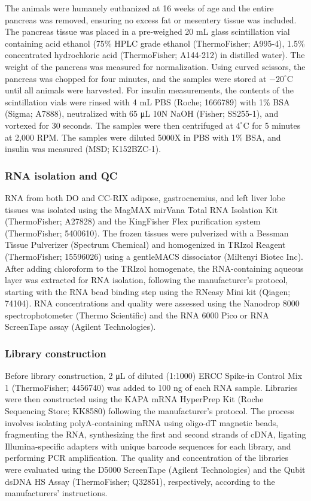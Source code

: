 \documentclass[
]{article}
\begin{document}
The animals were humanely euthanized at 16 weeks of age and the entire
pancreas was removed, ensuring no excess fat or mesentery tissue was
included. The pancreas tissue was placed in a pre-weighed 20 mL glass
scintillation vial containing acid ethanol (75\% HPLC grade ethanol
(ThermoFisher; A995-4), 1.5\% concentrated hydrochloric acid
(ThermoFisher; A144-212) in distilled water). The weight of the pancreas
was measured for normalization. Using curved scissors, the pancreas was
chopped for four minutes, and the samples were stored at
\(-20^{\circ}\)C until all animals were harvested. For insulin
measurements, the contents of the scintillation vials were rinsed with 4
mL PBS (Roche; 1666789) with 1\% BSA (Sigma; A7888), neutralized with 65
\si{\micro\liter} 10N NaOH (Fisher; SS255-1), and vortexed for 30
seconds. The samples were then centrifuged at \(4^{\circ}\)C for 5
minutes at 2,000 RPM. The samples were diluted 5000X in PBS with 1\%
BSA, and insulin was measured (MSD; K152BZC-1).

\subsubsection{RNA isolation and QC}\label{rna-isolation-and-qc}

RNA from both DO and CC-RIX adipose, gastrocnemius, and left liver lobe
tissues was isolated using the MagMAX mirVana Total RNA Isolation Kit
(ThermoFisher; A27828) and the KingFisher Flex purification system
(ThermoFisher; 5400610). The frozen tissues were pulverized with a
Bessman Tissue Pulverizer (Spectrum Chemical) and homogenized in
TRIzol\textsuperscript{\texttrademark} Reagent (ThermoFisher; 15596026)
using a gentleMACS dissociator (Miltenyi Biotec Inc). After adding
chloroform to the TRIzol homogenate, the RNA-containing aqueous layer
was extracted for RNA isolation, following the manufacturer's protocol,
starting with the RNA bead binding step using the RNeasy Mini kit
(Qiagen; 74104). RNA concentrations and quality were assessed using the
Nanodrop 8000 spectrophotometer (Thermo Scientific) and the RNA 6000
Pico or RNA ScreenTape assay (Agilent Technologies).

\subsubsection{Library construction}\label{library-construction}

Before library construction, 2 \si{\micro\liter} of diluted (1:1000)
ERCC Spike-in Control Mix 1 (ThermoFisher; 4456740) was added to 100 ng
of each RNA sample. Libraries were then constructed using the KAPA mRNA
HyperPrep Kit (Roche Sequencing Store; KK8580) following the
manufacturer's protocol. The process involves isolating polyA-containing
mRNA using oligo-dT magnetic beads, fragmenting the RNA, synthesizing
the first and second strands of cDNA, ligating Illumina-specific
adapters with unique barcode sequences for each library, and performing
PCR amplification. The quality and concentration of the libraries were
evaluated using the D5000 ScreenTape (Agilent Technologies) and the
Qubit dsDNA HS Assay (ThermoFisher; Q32851), respectively, according to
the manufacturers' instructions.
\end{document}
